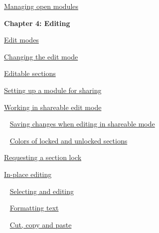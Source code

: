\documentclass[11pt,a4paper]{article}
\begin{document}
\href{https://www.ibm.com/support/knowledgecenter/search/Managing%20open%20modules?scope=SSYQBZ_9.6.1}{Managing open modules} \\



\newpage

\begin{Large}\textbf{Chapter 4: Editing} \end{Large} 
\vspace{1mm}

\href{https://www.ibm.com/support/knowledgecenter/search/Edit%20modes?scope=SSYQBZ_9.6.1}{Edit modes}

\href{https://www.ibm.com/support/knowledgecenter/search/Changing%20the%20edit%20mode?scope=SSYQBZ_9.6.1}{Changing the edit mode}

\href{https://www.ibm.com/support/knowledgecenter/search/Editable%20sections?scope=SSYQBZ_9.6.1}{Editable sections}

\href{https://www.ibm.com/support/knowledgecenter/search/Setting%20up%20a%20module%20for%20sharing?scope=SSYQBZ_9.6.1}{Setting up a module for sharing}

\href{https://www.ibm.com/support/knowledgecenter/search/Working%20in%20shareable%20edit%20mode?scope=SSYQBZ_9.6.1}{Working in shareable edit mode}

\,\,\, \href{https://www.ibm.com/support/knowledgecenter/search/Saving%20changes%20when%20editing%20in%20shareable%20mode?scope=SSYQBZ_9.6.1}{Saving changes when editing in shareable mode}

\,\,\, \href{https://www.ibm.com/support/knowledgecenter/search/Colors%20of%20locked%20and%20unlocked%20sections?scope=SSYQBZ_9.6.1}{Colors of locked and unlocked sections}

\href{https://www.ibm.com/support/knowledgecenter/search/Requesting%20a%20section%20lock?scope=SSYQBZ_9.6.1}{Requesting a section lock}

\href{https://www.ibm.com/support/knowledgecenter/search/In-place%20editing?scope=SSYQBZ_9.6.1}{In-place editing}

\,\,\, \href{https://www.ibm.com/support/knowledgecenter/search/Selecting%20and%20editing?scope=SSYQBZ_9.6.1}{Selecting and editing}

\,\,\, \href{https://www.ibm.com/support/knowledgecenter/search/Formatting%20text?scope=SSYQBZ_9.6.1}{Formatting text}

\,\,\, \href{https://www.ibm.com/support/knowledgecenter/search/Cut,%20copy%20and%20paste?scope=SSYQBZ_9.6.1}{Cut, copy and paste}
\end{document}

